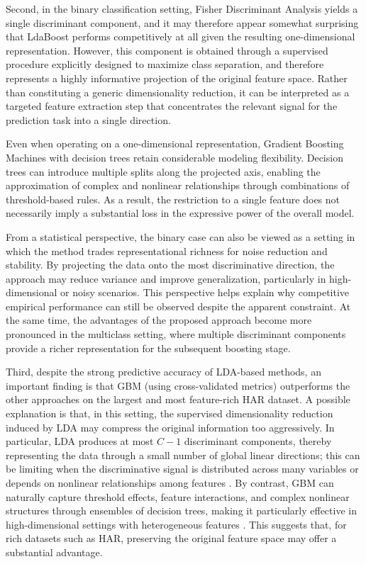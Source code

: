 \documentclass[11pt,a4paper]{article}
\begin{document}
{Second, in the binary classification setting, Fisher Discriminant Analysis yields a single discriminant component, and it may therefore appear somewhat surprising that LdaBoost performs competitively at all given the resulting one-dimensional representation. However, this component is obtained through a supervised procedure explicitly designed to maximize class separation, and therefore represents a highly informative projection of the original feature space. Rather than constituting a generic dimensionality reduction, it can be interpreted as a targeted feature extraction step that concentrates the relevant signal for the prediction task into a single direction.

Even when operating on a one-dimensional representation, Gradient Boosting Machines with decision trees retain considerable modeling flexibility. Decision trees can introduce multiple splits along the projected axis, enabling the approximation of complex and nonlinear relationships through combinations of threshold-based rules. As a result, the restriction to a single feature does not necessarily imply a substantial loss in the expressive power of the overall model.

From a statistical perspective, the binary case can also be viewed as a setting in which the method trades representational richness for noise reduction and stability. By projecting the data onto the most discriminative direction, the approach may reduce variance and improve generalization, particularly in high-dimensional or noisy scenarios. This perspective helps explain why competitive empirical performance can still be observed despite the apparent constraint. At the same time, the advantages of the proposed approach become more pronounced in the multiclass setting, where multiple discriminant components provide a richer representation for the subsequent boosting stage.

Third, despite the strong predictive accuracy of LDA-based methods, an important finding is that GBM (using cross-validated metrics) outperforms the other approaches on the largest and most feature-rich HAR dataset. A possible explanation is that, in this setting, the supervised dimensionality reduction induced by LDA may compress the original information too aggressively. In particular, LDA produces at most $C-1$ discriminant components, thereby representing the data through a small number of global linear directions; this can be limiting when the discriminative signal is distributed across many variables or depends on nonlinear relationships among features \citep{hastie2009elements}. By contrast, GBM can naturally capture threshold effects, feature interactions, and complex nonlinear structures through ensembles of decision trees, making it particularly effective in high-dimensional settings with heterogeneous features \citep{friedman2001gbm}. This suggests that, for rich datasets such as HAR, preserving the original feature space may offer a substantial advantage.

}
\end{document}
